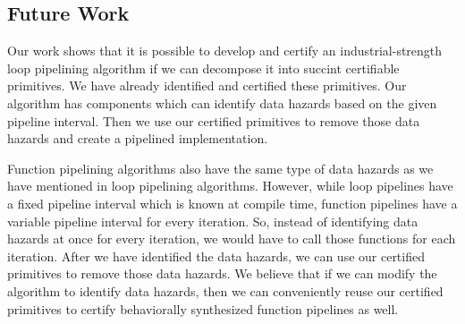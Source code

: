 \subsection{Future Work}
Our work shows that it is possible to develop and certify an industrial-strength loop pipelining algorithm if we can decompose it into succint certifiable primitives. We have already identified and certified these primitives. Our algorithm has components which can identify data hazards based on the given pipeline interval. Then we use our certified primitives to remove those data hazards and create a pipelined implementation.

Function pipelining algorithms also have the same type of data hazards as we have mentioned in loop pipelining algorithms. However, while loop pipelines have a fixed pipeline interval which is known at compile time, function pipelines have a variable pipeline interval for every iteration. So, instead of identifying data hazards at once for every iteration, we would have to call those functions for each iteration. After we have identified the data hazards, we can use our certified primitives to remove those data hazards. We believe that if we can modify the algorithm to identify data hazards, then we can conveniently reuse our certified primitives to certify behaviorally synthesized function pipelines as well.     